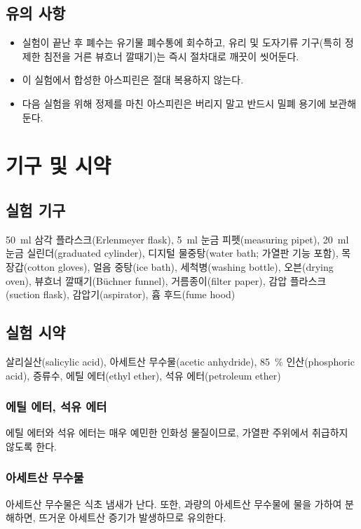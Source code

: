 \documentclass{GSHS-chemexp}
\begin{document}
	\subsection{유의 사항}
	\begin{itemize}
		\item 실험이 끝난 후 폐수는 유기물 폐수통에 회수하고,
		유리 및 도자기류 기구(특히 정제한 침전을 거른 뷰흐너 깔때기)는
		즉시 절차대로 깨끗이 씻어둔다.
		\item 이 실험에서 합성한 아스피린은 절대 복용하지 않는다.
		\item 다음 실험을 위해 정제를 마친 아스피린은 버리지 말고 반드시 밀폐 용기에 보관해둔다.
	\end{itemize}
	
	\section{기구 및 시약}
	
	\subsection{실험 기구}
	\SI{50}{\milli\litre} 삼각 플라스크(Erlenmeyer flask),
	\SI{5}{\milli\litre} 눈금 피펫(measuring pipet),
	\SI{20}{\milli\litre} 눈금 실린더(graduated cylinder),
	디지털 물중탕(water bath; 가열판 기능 포함), 목장갑(cotton gloves),
	얼음 중탕(ice bath), 세척병(washing bottle), 오븐(drying oven),
	뷰흐너 깔때기(Büchner funnel), 거름종이(filter paper),
	감압 플라스크(suction flask), 감압기(aspirator), 흄 후드(fume hood)
	
	\subsection{실험 시약}
	살리실산(salicylic acid), 아세트산 무수물(acetic anhydride),
	\SI{85}{\percent} 인산(phosphoric acid), 증류수,
	에틸 에터(ethyl ether), 석유 에터(petroleum ether)
	
	\subsubsection{에틸 에터, 석유 에터}
	에틸 에터와 석유 에터는 매우 예민한 인화성 물질이므로, 가열판 주위에서 취급하지 않도록 한다.
	
	\subsubsection{아세트산 무수물}
	아세트산 무수물은 식초 냄새가 난다. 또한, 과량의 아세트산 무수물에 물을 가하여 분해하면, 뜨거운 아세트산 증기가 발생하므로 유의한다.
	
\end{document}
